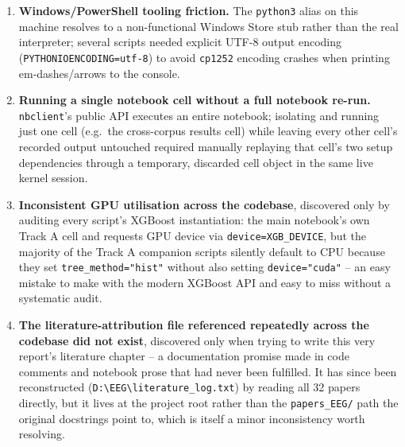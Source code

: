 \documentclass[11pt]{report}
\begin{document}
\begin{enumerate}
        channel-order file is named \texttt{Channel Order.xlsx} (space,
        capitalised) rather than the hyphenated lowercase name the adapter
        first assumed; and it ships no separate per-session label
        \texttt{.mat} file at all, only prose in \texttt{ReadMe.txt},
        requiring a defensive fallback that had to be manually verified
        against that prose before being trusted.
  \item \textbf{Windows/PowerShell tooling friction.} The \texttt{python3}
        alias on this machine resolves to a non-functional Windows Store
        stub rather than the real interpreter; several scripts needed
        explicit UTF-8 output encoding (\texttt{PYTHONIOENCODING=utf-8}) to
        avoid \texttt{cp1252} encoding crashes when printing em-dashes/arrows
        to the console.
  \item \textbf{Running a single notebook cell without a full notebook
        re-run.} \texttt{nbclient}'s public API executes an entire notebook;
        isolating and running just one cell (e.g.\ the cross-corpus results
        cell) while leaving every other cell's recorded output untouched
        required manually replaying that cell's two setup dependencies
        through a temporary, discarded cell object in the same live kernel
        session.
  \item \textbf{Inconsistent GPU utilisation across the codebase}, discovered
        only by auditing every script's XGBoost instantiation: the main
        notebook's own Track A cell and requests GPU device via
        \texttt{device=XGB\_DEVICE}, but the majority of the Track A
        companion scripts silently default to CPU because they set
        \texttt{tree\_method="hist"} without also setting
        \texttt{device="cuda"} -- an easy mistake to make with the modern
        XGBoost API and easy to miss without a systematic audit.
  \item \textbf{The literature-attribution file referenced repeatedly across
        the codebase did not exist}, discovered only when trying to write
        this very report's literature chapter -- a documentation promise
        made in code comments and notebook prose that had never been
        fulfilled. It has since been reconstructed
        (\texttt{D:\textbackslash EEG\textbackslash literature\_log.txt}) by reading all 32
        papers directly, but it lives at the project root rather than the
        \texttt{papers\_EEG/} path the original docstrings point to, which
        is itself a minor inconsistency worth resolving.
\end{enumerate}
\end{document}
